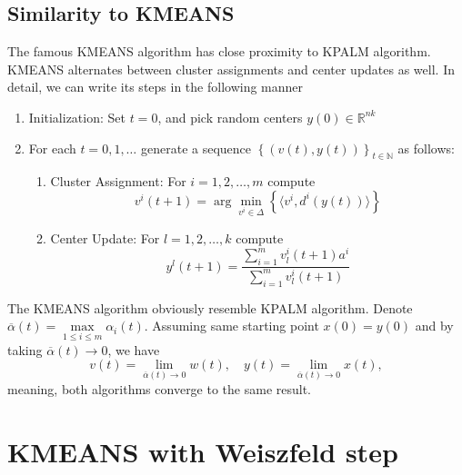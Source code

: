 \documentclass[11pt]{article}
\numberwithin{equation}{section}
\begin{document}
\subsection{Similarity to KMEANS}
The famous KMEANS algorithm has close proximity to KPALM algorithm. KMEANS alternates between cluster assignments and center updates as well. In detail, we can write its steps in the following manner

\begin{enumerate}[(1)]
	\item Initialization: Set $t=0$, and pick random centers $y(0) \in \mathbb{R}^{nk}$

	\item For each $t=0,1, \ldots$ generate a sequence $\left\lbrace(v(t),y(t))\right\rbrace_{t \in \mathbb{N}}$ as follows:
	\begin{enumerate}[(2.1)]
		\item Cluster Assignment: For $i=1, 2, \ldots ,m$ compute
		\begin{equation}
			v^i(t+1) = \arg\min\limits_{v^i \in \Delta} \left\lbrace \langle v^i , d^i(y(t)) \rangle\right\rbrace \label{StateEq12}
		\end{equation}
		
		\item Center Update: For $l=1, 2, \ldots ,k$ compute
		\begin{equation}
			y^l(t+1) = \frac{\sum_{i=1}^{m} v^i_l(t+1) a^i}{\sum_{i=1}^{m} v^i_l(t+1)} \label{StateEq13}
		\end{equation}
	\end{enumerate}
\end{enumerate}
The KMEANS algorithm obviously resemble KPALM algorithm. Denote $\overline{\alpha}(t) = \max\limits_{1 \leq i \leq m} \alpha_i(t)$. Assuming same starting point $x(0) = y(0)$ and by taking $\overline{\alpha}(t) \to 0$, we have
\begin{equation*}
	v(t) = \lim_{\overline{\alpha}(t) \to 0} w(t), \quad
	y(t) = \lim_{\overline{\alpha}(t) \to 0} x(t),
\end{equation*}
meaning, both algorithms converge to the same result.

\newpage

\section{KMEANS with Weiszfeld step }
\end{document}
